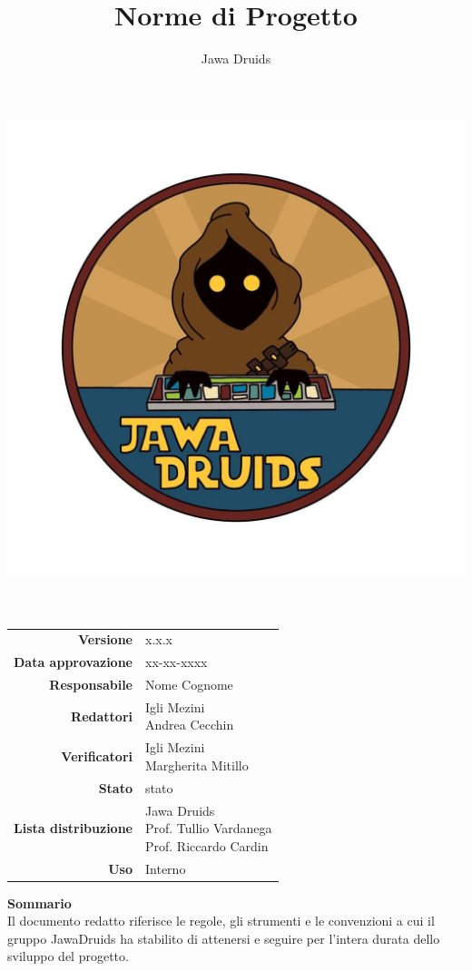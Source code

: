 



	\makeatletter
	\begin{titlepage}
		\begin{center}
			\vspace*{-5cm}
			\author{Jawa Druids}
			\title{Norme di Progetto}
			\date{}
			\includegraphics[width=0.7\linewidth]{../immagini/DRUIDSLOGO.jpg}\\[4ex]
			{\huge \bfseries  \@title }\\[2ex] 
			{\LARGE  \@author}\\[50ex]
			\vspace*{-9,0cm}
			\begin{table}[H]
				\renewcommand{\arraystretch}{1.4}
				\centering
				\begin{tabular}{r | l}
					\textbf{Versione} & x.x.x \\
					\textbf{Data approvazione} & xx-xx-xxxx\\
					\textbf{Responsabile} & Nome Cognome\\
					\textbf{Redattori} & \makecell[tl]{Igli Mezini \\ Andrea Cecchin} \\ 
					
					\textbf{Verificatori} & \makecell[tl]{Igli Mezini \\ Margherita Mitillo} \\
					\textbf{Stato} & stato\\
					\textbf{Lista distribuzione} & \makecell[tl]{Jawa Druids \\ Prof. Tullio Vardanega \\ Prof. Riccardo Cardin}\\
					\textbf{Uso} & Interno			
				\end{tabular}
			\end{table}
			\vspace{0.1cm}
			\hfill \break
			\fontsize{17}{10}\textbf{Sommario} \\
			\vspace{0.1cm}
			Il documento redatto riferisce le regole, gli strumenti e le convenzioni a cui il gruppo JawaDruids ha stabilito di attenersi e seguire per l'intera durata dello sviluppo del progetto.
		\end{center}
	\end{titlepage}
	\makeatother
	
	
